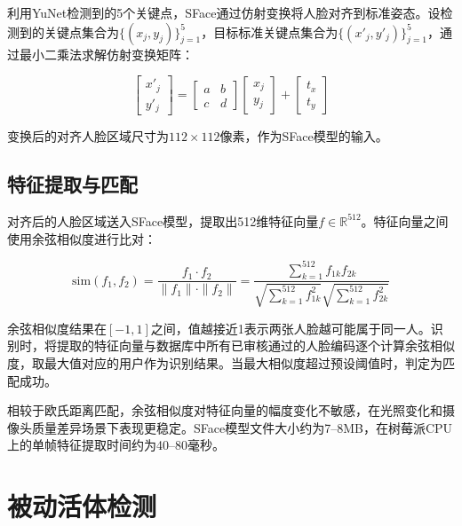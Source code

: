 利用YuNet检测到的5个关键点，SFace通过仿射变换将人脸对齐到标准姿态。设检测到的关键点集合为$\{(x_j, y_j)\}_{j=1}^{5}$，目标标准关键点集合为$\{(x'_j, y'_j)\}_{j=1}^{5}$，通过最小二乘法求解仿射变换矩阵：

\begin{equation}
    \begin{bmatrix}
        x'_j \\
        y'_j
    \end{bmatrix}
    =
    \begin{bmatrix}
        a & b \\
        c & d
    \end{bmatrix}
    \begin{bmatrix}
        x_j \\
        y_j
    \end{bmatrix}
    +
    \begin{bmatrix}
        t_x \\
        t_y
    \end{bmatrix}
\end{equation}

变换后的对齐人脸区域尺寸为$112 \times 112$像素，作为SFace模型的输入。

\subsection{特征提取与匹配}

对齐后的人脸区域送入SFace模型，提取出512维特征向量$f \in \mathbb{R}^{512}$。特征向量之间使用余弦相似度进行比对：

\begin{equation}
    \text{sim}(f_1, f_2) = \frac{f_1 \cdot f_2}{\|f_1\| \cdot \|f_2\|} = \frac{\sum_{k=1}^{512} f_{1k} f_{2k}}{\sqrt{\sum_{k=1}^{512} f_{1k}^2} \sqrt{\sum_{k=1}^{512} f_{2k}^2}}
\end{equation}

余弦相似度结果在$[-1, 1]$之间，值越接近1表示两张人脸越可能属于同一人。识别时，将提取的特征向量与数据库中所有已审核通过的人脸编码逐个计算余弦相似度，取最大值对应的用户作为识别结果。当最大相似度超过预设阈值时，判定为匹配成功。

相较于欧氏距离匹配，余弦相似度对特征向量的幅度变化不敏感，在光照变化和摄像头质量差异场景下表现更稳定。SFace模型文件大小约为7--8MB，在树莓派CPU上的单帧特征提取时间约为40--80毫秒。

\section{被动活体检测}

